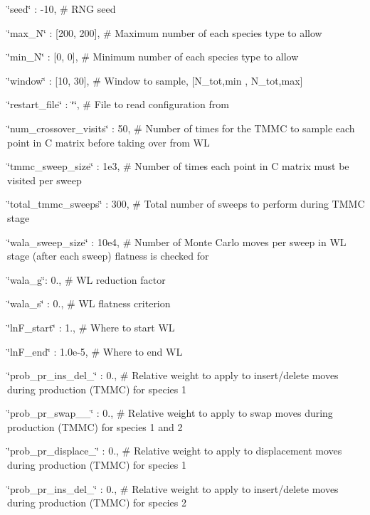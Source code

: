 \char`\"{}seed\char`\"{} \-: -\/10, \# R\-N\-G seed

\char`\"{}max\-\_\-\-N\char`\"{} \-: \mbox{[}200, 200\mbox{]}, \# Maximum number of each species type to allow

\char`\"{}min\-\_\-\-N\char`\"{} \-: \mbox{[}0, 0\mbox{]}, \# Minimum number of each species type to allow

\char`\"{}window\char`\"{} \-: \mbox{[}10, 30\mbox{]}, \# Window to sample, \mbox{[}N\-\_\-tot,min , N\-\_\-tot,max\mbox{]}

\char`\"{}restart\-\_\-file\char`\"{} \-: \char`\"{}\char`\"{}, \# File to read configuration from

\char`\"{}num\-\_\-crossover\-\_\-visits\char`\"{} \-: 50, \# Number of times for the T\-M\-M\-C to sample each point in C matrix before taking over from W\-L

\char`\"{}tmmc\-\_\-sweep\-\_\-size\char`\"{} \-: 1e3, \# Number of times each point in C matrix must be visited per sweep

\char`\"{}total\-\_\-tmmc\-\_\-sweeps\char`\"{} \-: 300, \# Total number of sweeps to perform during T\-M\-M\-C stage

\char`\"{}wala\-\_\-sweep\-\_\-size\char`\"{} \-: 10e4, \# Number of Monte Carlo moves per sweep in W\-L stage (after each sweep) flatness is checked for

\char`\"{}wala\-\_\-g\char`\"{}\-: 0., \# W\-L reduction factor

\char`\"{}wala\-\_\-s\char`\"{} \-: 0., \# W\-L flatness criterion

\char`\"{}ln\-F\-\_\-start\char`\"{} \-: 1., \# Where to start W\-L

\char`\"{}ln\-F\-\_\-end\char`\"{} \-: 1.\-0e-\/5, \# Where to end W\-L

\char`\"{}prob\-\_\-pr\-\_\-ins\-\_\-del\-\_\char`\"{} \-: 0., \# Relative weight to apply to insert/delete moves during production (T\-M\-M\-C) for species 1

\char`\"{}prob\-\_\-pr\-\_\-swap\-\_\-\_\char`\"{} \-: 0., \# Relative weight to apply to swap moves during production (T\-M\-M\-C) for species 1 and 2

\char`\"{}prob\-\_\-pr\-\_\-displace\-\_\char`\"{} \-: 0., \# Relative weight to apply to displacement moves during production (T\-M\-M\-C) for species 1

\char`\"{}prob\-\_\-pr\-\_\-ins\-\_\-del\-\_\char`\"{} \-: 0., \# Relative weight to apply to insert/delete moves during production (T\-M\-M\-C) for species 2

